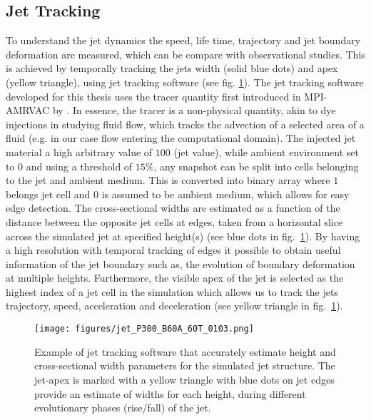 \documentclass[12pt]{ociamthesis}
\newcommand{\fref}[1]{fig. \ref{#1}}
\begin{document}
\subsection{Jet Tracking}
\label{subsec:jet_tracking}
To understand the jet dynamics the speed, life time, trajectory and jet boundary deformation are measured, which can be compare with observational studies. This is achieved by temporally tracking the jets width (solid blue dots) and apex (yellow triangle), using jet tracking software (see \fref{jet_tracker}). The jet tracking software developed for this thesis uses the tracer quantity first introduced in MPI-AMRVAC by \cite{Porth_2014}. In essence, the tracer is a non-physical quantity, akin to dye injections in studying fluid flow, which tracks the advection of a selected area of a fluid (e.g. in our case flow entering the computational domain). The injected jet material a high arbitrary value of $100$ (jet value), while ambient environment set to 0 and using a threshold of $15\%$, any snapshot can be split into cells belonging to the jet and ambient medium. This is converted into binary array where $1$ belongs jet cell and $0$ is assumed to be ambient medium, which allows for easy edge detection. The cross-sectional widths are estimated as a function of the distance between the opposite jet cells at edges, taken from a horizontal slice across the simulated jet at specified height(s) (see blue dots in fig.~\ref{jet_tracker}). By having a high resolution with temporal tracking of edges it possible to obtain useful information of the jet boundary such as, the evolution of boundary deformation at multiple heights. Furthermore, the visible apex of the jet is selected as the highest index of a jet cell in the simulation which allows us to track the jets trajectory, speed, acceleration and deceleration (see yellow triangle in fig.~\ref{jet_tracker}).
\begin{figure}
\centering
{\texttt{[image: figures/jet\_P300\_B60A\_60T\_0103.png]}} 
\caption{Example of jet tracking software that accurately estimate height and cross-sectional width parameters for the simulated jet structure. The jet-apex is marked with a yellow triangle with blue dots on jet edges provide an estimate of widths for each height, during different evolutionary phases (rise/fall) of the jet.}
\label{jet_tracker}
\end{figure}
\end{document}
